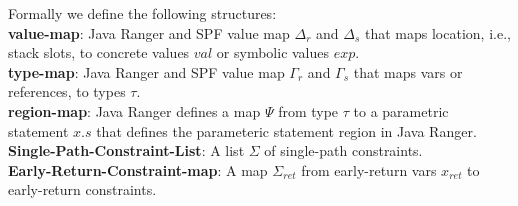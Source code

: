 Formally we define the following structures: \\
\textbf{value-map}: Java Ranger and SPF value map $\Delta_r$ and $\Delta_s$  that maps location, i.e., stack slots, to concrete values $val$ or symbolic values $exp$. \\
\textbf{type-map}: Java Ranger and SPF value map $\Gamma_r$ and $\Gamma_s$  that maps vars or references, to types $\tau$.\\
\textbf{region-map}: Java Ranger defines a map $\Psi$ from type $\tau$  to a parametric statement $x.s$ that defines the parameteric statement region in Java Ranger.\\
\textbf{Single-Path-Constraint-List}: A list $\Sigma$ of single-path constraints.\\
\textbf{Early-Return-Constraint-map}: A map $\Sigma_{ret}$ from early-return vars $x_{ret}$ to early-return constraints.



